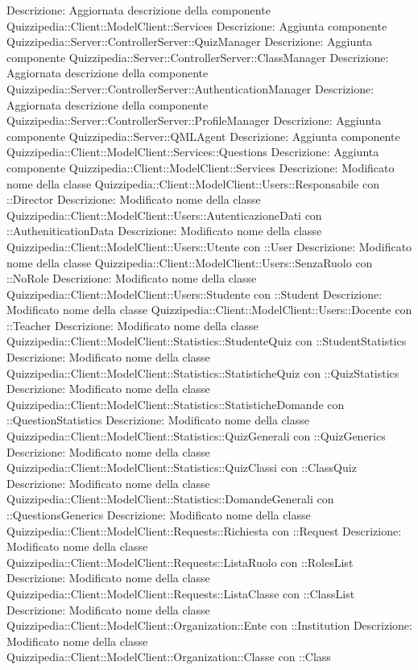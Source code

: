 Descrizione: Aggiornata descrizione della componente Quizzipedia::Client::ModelClient::Services 
Descrizione: Aggiunta componente Quizzipedia::Server::ControllerServer::QuizManager 
Descrizione: Aggiunta componente Quizzipedia::Server::ControllerServer::ClassManager 
Descrizione: Aggiornata descrizione della componente Quizzipedia::Server::ControllerServer::AuthenticationManager 
Descrizione: Aggiornata descrizione della componente Quizzipedia::Server::ControllerServer::ProfileManager 
Descrizione: Aggiunta componente Quizzipedia::Server::QMLAgent 
Descrizione: Aggiunta componente Quizzipedia::Client::ModelClient::Services::Questions 
Descrizione: Aggiunta componente Quizzipedia::Client::ModelClient::Services 
Descrizione: Modificato nome della classe Quizzipedia::Client::ModelClient::Users::Responsabile con ::Director 
Descrizione: Modificato nome della classe Quizzipedia::Client::ModelClient::Users::AutenticazioneDati con ::AutheniticationData 
Descrizione: Modificato nome della classe Quizzipedia::Client::ModelClient::Users::Utente con ::User 
Descrizione: Modificato nome della classe Quizzipedia::Client::ModelClient::Users::SenzaRuolo con ::NoRole 
Descrizione: Modificato nome della classe Quizzipedia::Client::ModelClient::Users::Studente con ::Student 
Descrizione: Modificato nome della classe Quizzipedia::Client::ModelClient::Users::Docente con ::Teacher 
Descrizione: Modificato nome della classe Quizzipedia::Client::ModelClient::Statistics::StudenteQuiz con ::StudentStatistics 
Descrizione: Modificato nome della classe Quizzipedia::Client::ModelClient::Statistics::StatisticheQuiz con ::QuizStatistics 
Descrizione: Modificato nome della classe Quizzipedia::Client::ModelClient::Statistics::StatisticheDomande con ::QuestionStatistics 
Descrizione: Modificato nome della classe Quizzipedia::Client::ModelClient::Statistics::QuizGenerali con ::QuizGenerics 
Descrizione: Modificato nome della classe Quizzipedia::Client::ModelClient::Statistics::QuizClassi con ::ClassQuiz 
Descrizione: Modificato nome della classe Quizzipedia::Client::ModelClient::Statistics::DomandeGenerali con ::QuestionsGenerics 
Descrizione: Modificato nome della classe Quizzipedia::Client::ModelClient::Requests::Richiesta con ::Request 
Descrizione: Modificato nome della classe Quizzipedia::Client::ModelClient::Requests::ListaRuolo con ::RolesList 
Descrizione: Modificato nome della classe Quizzipedia::Client::ModelClient::Requests::ListaClasse con ::ClassList 
Descrizione: Modificato nome della classe Quizzipedia::Client::ModelClient::Organization::Ente con ::Institution 
Descrizione: Modificato nome della classe Quizzipedia::Client::ModelClient::Organization::Classe con ::Class 
